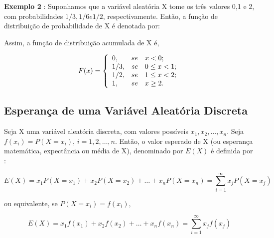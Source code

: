 \textbf{Exemplo 2} : Suponhamos que a variável aleatória X tome os
três valores 0,1 e 2, com probabilidades $1/3, 1/6 e 1/2$,
respectivamente. Então, a função de distribuição de probabilidade
de X é denotada por:


\begin{table}[!htb]
\end{table}

Assim, a função de distribuição acumulada de X é,

$$
F(x)=
\left\{%
\begin{array}{ll}
   0   , & se \quad \hbox{$x < 0$;} \\
   1/3 , & se \quad \hbox{$0 \leq x < 1$;} \\
   1/2 , & se \quad \hbox{$1 \leq x < 2$;} \\
   1   , & se \quad \hbox{$x \geq 2$.} \\
\end{array}%
\right.
$$



\subsection{Esperança de uma Variável Aleatória Discreta}

Seja X uma variável aleatória discreta, com valores possíveis
$x_{1},x_{2},\ldots,x_{n}$. Seja $ f(x_{i})= P(X=x_{i})$,
$i=1,2,\ldots,n$. Então, o valor esperado de X (ou esperança
matemática, expectância ou média de X), denominado por $E(X)$ é
definida por :


\begin{equation}\label{e(x)}
    E(X) = x_{1}P(X=x_{1})+x_{2}P(X=x_{2})+\ldots+x_{n}P(X=x_{n})= \sum_{i=1}^{\infty} x_{j}P(X=x_{j})
\end{equation}

ou equivalente, se $P(X=x_{i})=f(x_{i})$,


\begin{equation}\label{e(x)}
    E(X) = x_{1}f(x_{1})+x_{2}f(x_{2})+\ldots+x_{n}f(x_{n})= \sum_{i=1}^{\infty} x_{j}f(x_{j})
\end{equation}



